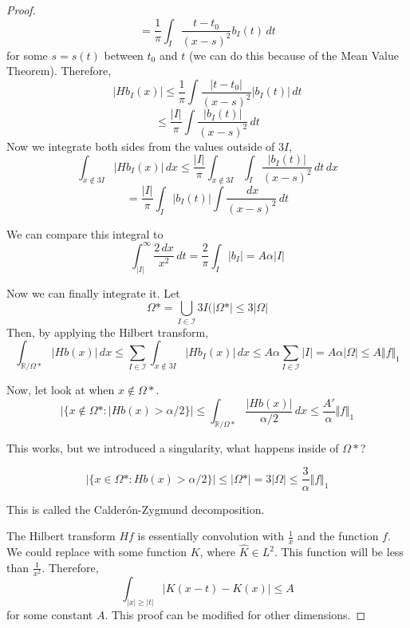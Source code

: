 \documentclass[12pt]{article}
\begin{document}
\begin{proof}
$$= \frac{1}{\pi} \int_I \frac{t-t_0}{(x-s)^2} b_I(t) \, dt$$
for some $s = s(t)$ between $t_0$ and $t$ (we can do this because of the Mean Value Theorem). Therefore, 
$$\vert Hb_I(x)\vert \leq \frac{1}{\pi}\int \frac{\vert t-t_0\vert}{(x-s)^2}\vert b_I(t)\vert \,dt$$
$$ \leq \frac{\vert I \vert}{\pi} \int \frac{\vert b_I(t) \vert}{(x-s)^2} \,dt$$
Now we integrate both sides from the values outside of $3I$,
$$\int_{x\not\in 3I} \vert Hb_I(x)\vert \,dx \leq \frac{\vert I \vert}{\pi} \int_{x \not \in 3I} \int_I \frac{\vert b_I(t)\vert}{(x-s)^2}\,dt\,dx$$
$$= \frac{\vert I \vert}{\pi} \int_I \vert b_I(t)\vert \int \frac{\,dx}{(x-s)^2} \,dt$$

We can compare this integral to 
$$ \int^\infty_{\vert I \vert } \frac{2\,dx}{x^2} \,dt
 = \frac{2}{\pi} \int_I \vert b_I \vert  = A \alpha \vert I \vert$$
 
 Now we can finally integrate it. Let 
 $$\Omega* = \bigcup_{I \in \mathcal{I}} 3I (\vert \Omega* \vert \leq 3 \vert \Omega \vert$$
 Then, by applying the Hilbert transform,
 $$\int_{\mathbb{R}/ \Omega*} \vert Hb(x) \vert \,dx \leq \sum_{I \in \mathcal{I}} \int_{x \not \in 3I} \vert Hb_I(x)\vert \,dx \leq A \alpha \sum_{I \in \mathcal{I}} \vert I \vert = A \alpha \vert \Omega \vert \leq A \Vert f\Vert_1$$
 
 Now, let look at when $x \not \in \Omega*$. 
 $$\vert \{ x \not \in \Omega* : \vert Hb(x) > \alpha/2\}\vert \leq \int_{\mathbb{R}/\Omega*} \frac{\vert Hb(x)\vert}{\alpha/2} \,dx \leq \frac{A'}{\alpha} \Vert f \Vert_1$$
 
 This works, but we introduced a singularity, what happens inside of $\Omega*$?
 
 $$\vert \{ x \in \Omega* : Hb(x) > \alpha/2\} \vert \leq \vert \Omega*\vert = 3 \vert \Omega\vert \leq \frac{3}{\alpha} \Vert f \Vert_1$$
 
 This is called the Calder\'on-Zygmund decomposition. 
 
 The Hilbert transform $Hf$ is essentially convolution with $\frac{1}{x}$ and the function $f$. We could replace with some function $K$, where $\hat{K} \in L^2$. This function will be less than $\frac{1}{x^2}$. Therefore, 
 $$\int_{\vert x\vert \geq \vert t\vert} \vert K(x-t) - K(x)\vert \leq A$$ for some constant $A$. This proof can be modified for other dimensions.
 \end{proof}
\end{document}
